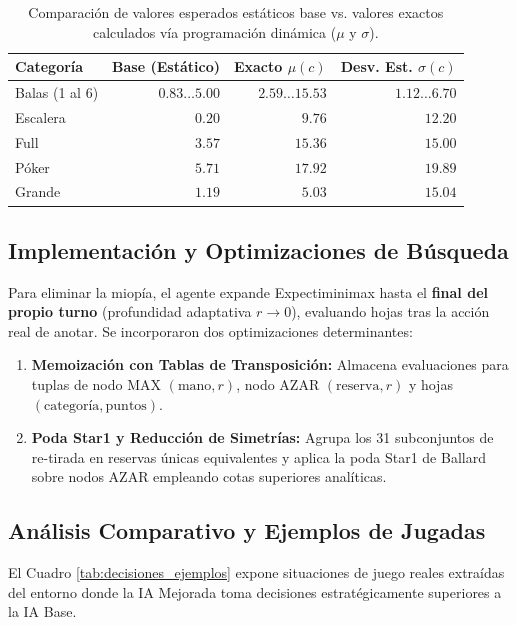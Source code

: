 \documentclass[10pt, a4paper]{article}
\begin{document}
\begin{table}[htbp]
\centering
\small
\caption{Comparación de valores esperados estáticos base vs. valores exactos calculados vía programación dinámica ($\mu$ y $\sigma$).}
\label{tab:valores_exactos}
\begin{tabular}{lrrr}
\toprule
\textbf{Categoría} & \textbf{Base (Estático)} & \textbf{Exacto $\mu(c)$} & \textbf{Desv. Est. $\sigma(c)$} \\
\midrule
Balas (1 al 6) & $0.83 \dots 5.00$ & $2.59 \dots 15.53$ & $1.12 \dots 6.70$ \\
Escalera & $0.20$ & $9.76$ & $12.20$ \\
Full & $3.57$ & $15.36$ & $15.00$ \\
Póker & $5.71$ & $17.92$ & $19.89$ \\
Grande & $1.19$ & $5.03$ & $15.04$ \\
\bottomrule
\end{tabular}
\end{table}

\subsection{Implementación y Optimizaciones de Búsqueda}
Para eliminar la miopía, el agente expande Expectiminimax hasta el \textbf{final del propio turno} (profundidad adaptativa $r \to 0$), evaluando hojas tras la acción real de anotar. Se incorporaron dos optimizaciones determinantes:
\begin{enumerate}
    \item \textbf{Memoización con Tablas de Transposición:} Almacena evaluaciones para tuplas de nodo MAX $(\text{mano}, r)$, nodo AZAR $(\text{reserva}, r)$ y hojas $(\text{categoría}, \text{puntos})$.
    \item \textbf{Poda Star1 y Reducción de Simetrías:} Agrupa los 31 subconjuntos de re-tirada en reservas únicas equivalentes y aplica la poda Star1 de Ballard \cite{ballard1983star} sobre nodos AZAR empleando cotas superiores analíticas.
\end{enumerate}

\subsection{Análisis Comparativo y Ejemplos de Jugadas}
El Cuadro \ref{tab:decisiones_ejemplos} expone situaciones de juego reales extraídas del entorno donde la IA Mejorada toma decisiones estratégicamente superiores a la IA Base.
\end{document}
